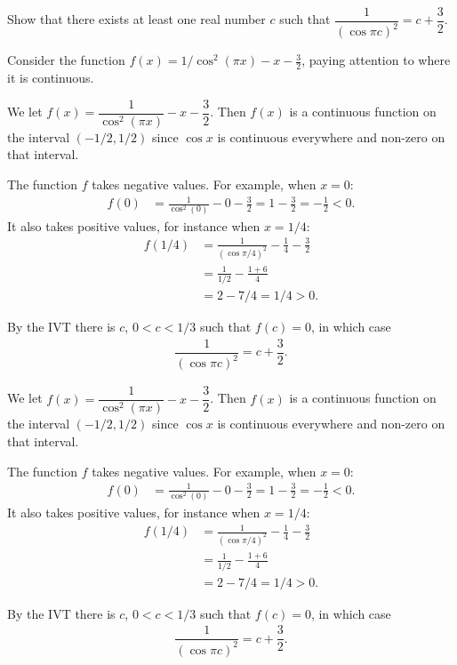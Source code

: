 \begin{question}[2015Q]
Show that there exists at least one real number $c$ such that
$\dfrac{1}{(\cos\pi c)^2} = c+\dfrac{3}{2}$.
\end{question}
\begin{hint}
Consider the function $f(x)=1/\cos^2(\pi x)-x-\frac{3}{2}$, paying attention to where it is continuous.
\end{hint}
\begin{answer}
We let $f(x)=\dfrac{1}{\cos^2(\pi x)}-x-\dfrac{3}{2}$. Then $f(x)$ is a continuous function on the
interval $(-1/2, 1/2)$ since $\cos x$ is continuous everywhere and non-zero on that
interval.

The function $f$ takes negative values.  For example, when $x=0$:
\begin{align*}
f(0) &= \frac{1}{\cos^2(0)} - 0 - \frac{3}{2} = 1-\frac{3}{2} = -\frac{1}{2} <0.
\end{align*}
It also takes positive values, for instance when $x=1/4$:
\begin{align*}
f(1/4) &= \frac{1}{(\cos \pi/4)^2} - \frac{1}{4} - \frac{3}{2} \\
  &= \frac{1}{1/2} - \frac{1+6}{4} \\
  &= 2 - 7/4 = 1/4 >0.
\end{align*}

By the IVT there is $c$, $0<c<1/3$ such that $f(c)=0$, in which case
\begin{align*}
\dfrac{1}{(\cos\pi c)^2} = c+\dfrac{3}{2}.
\end{align*}
\end{answer}
\begin{solution}
We let $f(x)=\dfrac{1}{\cos^2(\pi x)}-x-\dfrac{3}{2}$. Then $f(x)$ is a continuous function on the
interval $(-1/2, 1/2)$ since $\cos x$ is continuous everywhere and non-zero on that
interval.

The function $f$ takes negative values.  For example, when $x=0$:
\begin{align*}
f(0) &= \frac{1}{\cos^2(0)} - 0 - \frac{3}{2} = 1-\frac{3}{2} = -\frac{1}{2} <0.
\end{align*}
It also takes positive values, for instance when $x=1/4$:
\begin{align*}
f(1/4) &= \frac{1}{(\cos \pi/4)^2} - \frac{1}{4} - \frac{3}{2} \\
  &= \frac{1}{1/2} - \frac{1+6}{4} \\
  &= 2 - 7/4 = 1/4 >0.
\end{align*}

By the IVT there is $c$, $0<c<1/3$ such that $f(c)=0$, in which case
\begin{align*}
\dfrac{1}{(\cos\pi c)^2} = c+\dfrac{3}{2}.
\end{align*}
\end{solution}







